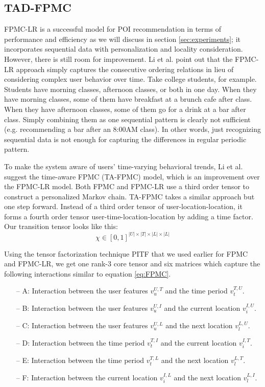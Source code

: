 \documentclass{sig-alternate}
\begin{document}
\subsection{TAD-FPMC}
\label{sec:typeChangesSpecialChars}

FPMC-LR is a successful model for POI recommendation in terms of performance and efficiency 
as we will discuss in section \ref{sec:experiments}; it incorporates sequential data with personalization and locality consideration. 
However, there is still room for improvement. Li et al. \cite{Li:2017} point out that the FPMC-LR approach simply captures 
the consecutive ordering relations in lieu of considering complex user behavior over time. Take college students, 
for example. Students have morning classes, afternoon classes, or both in one day. When they have morning classes, 
some of them have breakfast at a brunch cafe after class. When they have afternoon classes, some of them go 
for a drink at a bar after class. Simply combining them as one sequential pattern is clearly not sufficient (e.g. recommending a bar after an 8:00AM class). In other words, just recognizing sequential data is not 
enough for capturing the differences in regular periodic pattern.

To make the system aware of users' time-varying behavioral trends, Li et al. \cite{Li:2017} suggest the time-aware FPMC (TA-FPMC) 
model, which is an improvement over the FPMC-LR model. Both FPMC and FPMC-LR use a third order tensor to 
construct a personalized Markov chain. TA-FPMC takes a similar approach but one step forward. Instead of a third order tensor of 
user-location-location, it forms a fourth order tensor user-time-location-location by adding a time factor. Our transition tensor looks like this: 
\begin{equation}
	\chi \in [0, 1]^{|U| \times |T| \times |L| \times |L|}
\label{eq:TA-FPMC_tensor}
\end{equation}

Using the tensor factorization technique PITF that we used earlier for FPMC and FPMC-LR, we get 
one rank-3 core tensor and six matrices which capture the following interactions similar to equation \ref{eq:FPMC}.

\begin{itemize}
\item[--] A: Interaction between the user features $v_u^{U,T}$ and the time period $v_t^{T,U}$.
\item[--] B: Interaction between the user features $v_u^{U,I}$ and the current location $v_i^{I,U}$.
\item[--] C: Interaction between the user features $v_u^{U,L}$ and the next location $v_l^{L,U}$.
\item[--] D: Interaction between the time period $v_t^{T,I}$ and the current location $v_i^{I,T}$.
\item[--] E: Interaction between the time period $v_t^{T,L}$ and the next location $v_l^{L,T}$.
\item[--] F: Interaction between the current location $v_i^{I,L}$ and the next location $v_l^{L,I}$.
\end{itemize}
\end{document}
